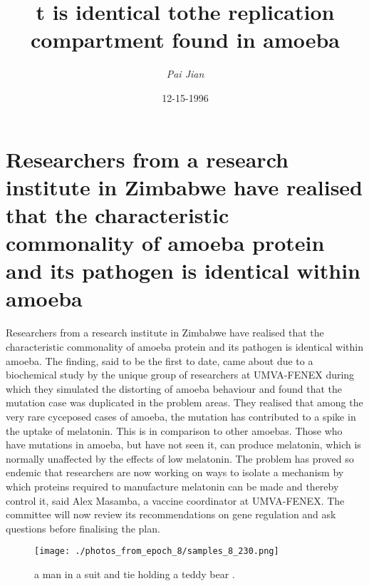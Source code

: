 \documentclass{article}%
\title{t is identical tothe replication compartment found in amoeba}%
\author{\textit{Pai Jian}}%
\date{12-15-1996}%
\begin{document}
%
\normalsize%
\maketitle%
\section{Researchers from a research institute in Zimbabwe have realised that the characteristic commonality of amoeba protein and its pathogen is identical within amoeba}%
\label{sec:ResearchersfromaresearchinstituteinZimbabwehaverealisedthatthecharacteristiccommonalityofamoebaproteinanditspathogenisidenticalwithinamoeba}%
Researchers from a research institute in Zimbabwe have realised that the characteristic commonality of amoeba protein and its pathogen is identical within amoeba.\newline%
The finding, said to be the first to date, came about due to a biochemical study by the unique group of researchers at UMVA{-}FENEX during which they simulated the distorting of amoeba behaviour and found that the mutation case was duplicated in the problem areas.\newline%
They realised that among the very rare cyceposed cases of amoeba, the mutation has contributed to a spike in the uptake of melatonin. This is in comparison to other amoebas.\newline%
Those who have mutations in amoeba, but have not seen it, can produce melatonin, which is normally unaffected by the effects of low melatonin. The problem has proved so endemic that researchers are now working on ways to isolate a mechanism by which proteins required to manufacture melatonin can be made and thereby control it, said Alex Masamba, a vaccine coordinator at UMVA{-}FENEX.\newline%
The committee will now review its recommendations on gene regulation and ask questions before finalising the plan.\newline%

%


\begin{figure}[h!]%
\centering%
\texttt{[image: ./photos\_from\_epoch\_8/samples\_8\_230.png]}%
\caption{a man in a suit and tie holding a teddy bear .}%
\end{figure}

%
\end{document}
